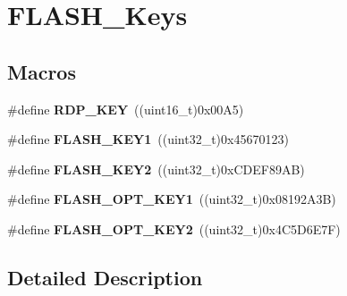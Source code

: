 \hypertarget{group___f_l_a_s_h___keys}{}\section{F\+L\+A\+S\+H\+\_\+\+Keys}
\label{group___f_l_a_s_h___keys}
\subsection*{Macros}
\begin{DoxyCompactItemize}
\item 
\hypertarget{group___f_l_a_s_h___keys_gae497135e5528d69274bf8daf7f077f23}{}\#define {\bfseries R\+D\+P\+\_\+\+K\+E\+Y}~((uint16\+\_\+t)0x00\+A5)\label{group___f_l_a_s_h___keys_gae497135e5528d69274bf8daf7f077f23}

\item 
\hypertarget{group___f_l_a_s_h___keys_gafd77e7bf91765d891ce63e2f0084b019}{}\#define {\bfseries F\+L\+A\+S\+H\+\_\+\+K\+E\+Y1}~((uint32\+\_\+t)0x45670123)\label{group___f_l_a_s_h___keys_gafd77e7bf91765d891ce63e2f0084b019}

\item 
\hypertarget{group___f_l_a_s_h___keys_gaee83d0f557e158da52f4a205db6b60a7}{}\#define {\bfseries F\+L\+A\+S\+H\+\_\+\+K\+E\+Y2}~((uint32\+\_\+t)0x\+C\+D\+E\+F89\+A\+B)\label{group___f_l_a_s_h___keys_gaee83d0f557e158da52f4a205db6b60a7}

\item 
\hypertarget{group___f_l_a_s_h___keys_gacebe54ff9ff12abcf0e4d3e697b2f116}{}\#define {\bfseries F\+L\+A\+S\+H\+\_\+\+O\+P\+T\+\_\+\+K\+E\+Y1}~((uint32\+\_\+t)0x08192\+A3\+B)\label{group___f_l_a_s_h___keys_gacebe54ff9ff12abcf0e4d3e697b2f116}

\item 
\hypertarget{group___f_l_a_s_h___keys_ga636d46db38e376f0483eed4b7346697c}{}\#define {\bfseries F\+L\+A\+S\+H\+\_\+\+O\+P\+T\+\_\+\+K\+E\+Y2}~((uint32\+\_\+t)0x4\+C5\+D6\+E7\+F)\label{group___f_l_a_s_h___keys_ga636d46db38e376f0483eed4b7346697c}

\end{DoxyCompactItemize}


\subsection{Detailed Description}
